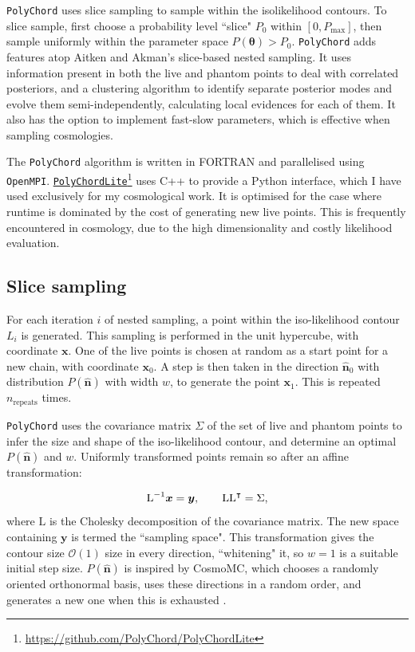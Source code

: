 \documentclass{article}
\begin{document}
\texttt{PolyChord} uses slice sampling to sample within the isolikelihood contours. To slice sample, first choose a probability level ``slice" $P_0$ within $[0, P_\textrm{max}]$, then sample uniformly within the parameter space $P(\bm\theta)>P_0$. \texttt{PolyChord} adds features atop Aitken and Akman's slice-based nested sampling. It uses information present in both the live and phantom points to deal with correlated posteriors, and a clustering algorithm to identify separate posterior modes and evolve them semi-independently, calculating local evidences for each of them. It also has the option to implement fast-slow parameters, which is effective when sampling cosmologies.

The \texttt{PolyChord} algorithm is written in FORTRAN and parallelised using \texttt{OpenMPI}. \href{https://github.com/PolyChord/PolyChordLite}{\texttt{PolyChordLite}}\footnote{\href{https://github.com/PolyChord/PolyChordLite}{https://github.com/PolyChord/PolyChordLite}} uses C++ to provide a Python interface, which I have used exclusively for my cosmological work. It is optimised for the case where runtime is dominated by the cost of generating new live points. This is frequently encountered in cosmology, due to the high dimensionality and costly likelihood evaluation.

\subsection{Slice sampling}

For each iteration $i$ of nested sampling, a point within the iso-likelihood contour $L_i$ is generated. This sampling is performed in the unit hypercube, with coordinate $\bm x$. One of the live points is chosen at random as a start point for a new chain, with coordinate $\bm x_0$. A step is then taken in the direction $\hat{\bm n}_0$ with distribution $P(\hat{\bm n})$ with width $w$, to generate the point $\bm x_1$. This is repeated $n_\textrm{repeats}$ times.

\texttt{PolyChord} uses the covariance matrix $\Sigma$ of the set of live and phantom points to infer the size and shape of the iso-likelihood contour, and determine an optimal $P(\hat{\bm n})$ and $w$. Uniformly transformed points remain so after an affine transformation:

\begin{equation}
  \textrm{L}^{-1}\bm x = \bm y,\qquad \textrm{LL}^{\intercal} = \Sigma\textrm,
\end{equation}
where $\textrm{L}$ is the Cholesky decomposition of the covariance matrix. The new space containing $\bm y$ is termed the ``sampling space". This transformation gives the contour size $\mathcal{O}(1)$ size in every direction, ``whitening" it, so $w=1$ is a suitable initial step size. 
$P(\hat{\bm n})$ is inspired by CosmoMC, which chooses a randomly oriented orthonormal basis, uses these directions in a random order, and generates a new one when this is exhausted \cite{CosmoMC}.
\end{document}
